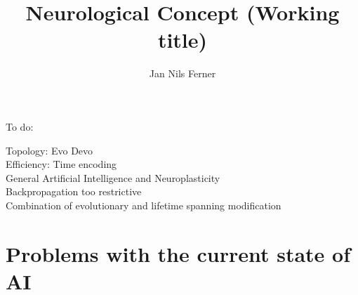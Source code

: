 \documentclass[a4paper]{article}
\title{Neurological Concept (Working title)}
\author{Jan Nils Ferner}
\begin{document}
\maketitle
\thispagestyle{empty}

\clearpage

\twocolumn

\begin{abstract}
	
\end{abstract}

\clearpage

\onecolumn
\tableofcontents
\twocolumn

\clearpage

To do:

Topology: Evo Devo\\
Efficiency: Time encoding\\
General Artificial Intelligence and Neuroplasticity\\
Backpropagation too restrictive\\
Combination of evolutionary and lifetime spanning modification\\

\section{Problems with the current state of AI}
	

\clearpage

\nocite{*}


\end{document}
